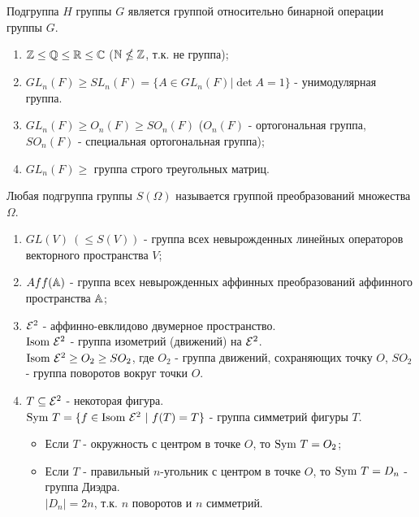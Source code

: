 \begin{subtheorem}
    Подгруппа $H$ группы $G$ является группой относительно бинарной операции группы $G$.
\end{subtheorem}
\begin{examples} \tab
    \begin{enumerate}
        \item $\mathbb{Z} \leq \mathbb{Q} \leq \mathbb{R} \leq \mathbb{C}$ ($\mathbb{N} \nleq \mathbb{Z}$, т.к. не группа);
        \item $GL_n(F) \geq SL_n(F) = \{A \in GL_n(F)| \det A = 1\}$ - унимодулярная группа.
        \item $GL_n(F) \geq O_n(F) \geq SO_n(F)$ ($O_n(F)$ - ортогональная группа, $SO_n(F)$ - специальная ортогональная группа);
        \item $GL_n(F) \geq$ группа строго треугольных матриц.
    \end{enumerate}
\end{examples}
\begin{definition}
    Любая подгруппа группы $S(\Omega)$ называется группой преобразований множества $\Omega$.
\end{definition}
\begin{examples} \tab
    \begin{enumerate}
        \item $GL(V) \ (\leq S(V))$ - группа всех невырожденных линейных операторов векторного пространства $V$;
        \item $Aff(\mathbb{A})$ - группа всех невырожденных аффинных преобразований аффинного пространства $\mathbb{A}$;
        \item $\mathcal{E}^2$ - аффинно-евклидово двумерное пространство.\\
        $\textup{Isom} \ \mathcal{E}^2$ - группа изометрий (движений) на $\mathcal{E}^2$.\\
        $\textup{Isom} \ \mathcal{E}^2 \geq O_2 \geq SO_2$, где $O_2$ - группа движений, сохраняющих точку $O$, $SO_2$ - группа поворотов вокруг точки $O$.
        \item $T \subseteq \mathcal{E}^2$ - некоторая фигура.\\
        $\textup{Sym}\ T = \{f \in \textup{Isom} \ \E^2 \ | \ f(T) = T\}$ - группа симметрий фигуры $T$.
        \begin{itemize}
            \item Если $T$ - окружность с центром в точке $O$, то $\textup{Sym}\ T = O_2$;
            \item Если $T$ - правильный $n$-угольник с центром в точке $O$, то $\textup{Sym}\ T = D_n$ - группа Диэдра.\\
            $|D_n| = 2n$, т.к. $n$ поворотов и $n$ симметрий. 
        \end{itemize} 
    \end{enumerate}
\end{examples}
